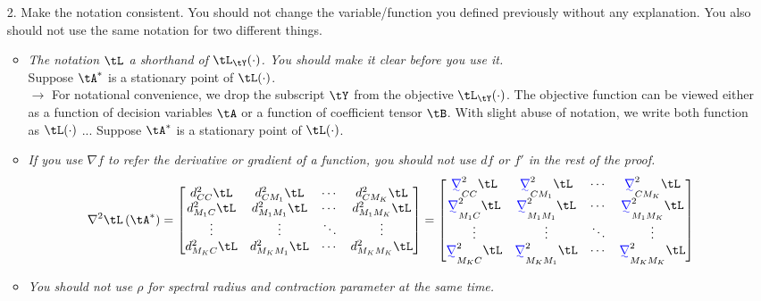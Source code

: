 \documentclass[11pt]{article}
\theoremstyle{plain}
\theoremstyle{definition}
\providecommand{\DIFaddtex}[1]{{\protect\color{blue}\uwave{#1}}} %
\providecommand{\DIFadd}[1]{{\DIFaddtex{#1}}} %
\begin{document}
\begin{enumerate}
    \item[2.] Make the notation consistent. You should not change the variable/function you defined previously without any explanation. You also should not use the same notation for two different things.
    \begin{itemize}
        \item \textit{ The notation $\tL$ a shorthand of $\tL_{\tY}(\cdot)$. You should make it clear before you use it.}\\Suppose $\tA^*$ is a stationary point of $\tL(\cdot)$.\\ 
        $\rightarrow$ For notational convenience, we drop the subscript $\tY$ from the objective $\tL_{\tY}(\cdot)$. The objective function can be viewed either as a function of decision variables $\tA$ or a function of coefficient tensor $\tB$. With slight abuse of notation, we write both function as $\tL(\cdot)$ ... Suppose  $\tA^*$ is a stationary point of $\tL(\cdot)$.
        \item \textit{If you use $\nabla f$ to refer the derivative or gradient of a function, you should not use $df$ or $f'$ in the rest of the proof.}
        \begin{align}   
         \nabla^2\tL\left(\tA^* \right) = \begin{bmatrix}  d_{CC}^{2} \tL &d_{CM_1}^{2} \tL  & \cdots & d_{CM_K}^{2} \tL \\ d_{M_1C}^{2} \tL  &d_{M_1 M_1}^{2} \tL & \cdots &  d_{M_1 M_K}^{2} \tL\\ \vdots & \vdots & \ddots & \vdots \\d_{M_KC}^{2} \tL& d_{M_K M_1}^{2} \tL & \cdots & d_{M_K M_K}^{2} \tL  \end{bmatrix} = \begin{bmatrix}  \DIFadd{\nabla}_{CC}^{2} \tL &\DIFadd{\nabla}_{CM_1}^{2} \tL  & \cdots & \DIFadd{\nabla}_{CM_K}^{2} \tL \\ \DIFadd{\nabla}_{M_1C}^{2} \tL  &\DIFadd{\nabla}_{M_1 M_1}^{2} \tL & \cdots &  \DIFadd{\nabla}_{M_1 M_K}^{2} \tL\\ \vdots & \vdots & \ddots & \vdots \\\DIFadd{\nabla}_{M_KC}^{2} \tL& \DIFadd{\nabla}_{M_K M_1}^{2} \tL & \cdots & \DIFadd{\nabla}_{M_K M_K}^{2} \tL  \end{bmatrix}        
       \end{align}
\item \textit{You should not use $\rho$ for spectral radius and contraction parameter at the same time.}\\

\end{itemize}
\end{enumerate}
\end{document}
